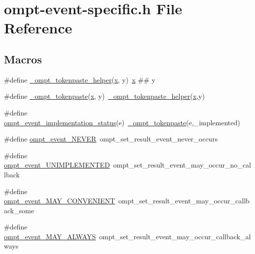 \hypertarget{ompt-event-specific_8h}{\section{ompt-\/event-\/specific.h File Reference}
\label{ompt-event-specific_8h}
}
\subsection*{Macros}
\begin{DoxyCompactItemize}
\item 
\#define \hyperlink{ompt-event-specific_8h_a164da313e074d6ea064ada353b36475d}{\-\_\-ompt\-\_\-tokenpaste\-\_\-helper}(\hyperlink{ittnotify__static_8h_a25eb27b280775b27a5ddc4d1673225aa}{x}, y)~\hyperlink{ittnotify__static_8h_a25eb27b280775b27a5ddc4d1673225aa}{x} \#\# y
\item 
\#define \hyperlink{ompt-event-specific_8h_aa58ed940a7c79f423856cf6e19aa7544}{\-\_\-ompt\-\_\-tokenpaste}(\hyperlink{ittnotify__static_8h_a25eb27b280775b27a5ddc4d1673225aa}{x}, y)~\hyperlink{ompt-event-specific_8h_a164da313e074d6ea064ada353b36475d}{\-\_\-ompt\-\_\-tokenpaste\-\_\-helper}(\hyperlink{ittnotify__static_8h_a25eb27b280775b27a5ddc4d1673225aa}{x},y)
\item 
\#define \hyperlink{ompt-event-specific_8h_a4566bae53765ccb37e5a8f1cb7b9cc99}{ompt\-\_\-event\-\_\-implementation\-\_\-status}(e)~\hyperlink{ompt-event-specific_8h_aa58ed940a7c79f423856cf6e19aa7544}{\-\_\-ompt\-\_\-tokenpaste}(e,\-\_\-implemented)
\item 
\#define \hyperlink{ompt-event-specific_8h_a20ce2d68a628f39fd7c0d3413e860641}{ompt\-\_\-event\-\_\-\-N\-E\-V\-E\-R}~ompt\-\_\-set\-\_\-result\-\_\-event\-\_\-never\-\_\-occurs
\item 
\#define \hyperlink{ompt-event-specific_8h_a5719430a79b410eee8d68fcec0fbf8f2}{ompt\-\_\-event\-\_\-\-U\-N\-I\-M\-P\-L\-E\-M\-E\-N\-T\-E\-D}~ompt\-\_\-set\-\_\-result\-\_\-event\-\_\-may\-\_\-occur\-\_\-no\-\_\-callback
\item 
\#define \hyperlink{ompt-event-specific_8h_ac90b1cf76e06d7fcbed9abf431841cbd}{ompt\-\_\-event\-\_\-\-M\-A\-Y\-\_\-\-C\-O\-N\-V\-E\-N\-I\-E\-N\-T}~ompt\-\_\-set\-\_\-result\-\_\-event\-\_\-may\-\_\-occur\-\_\-callback\-\_\-some
\item 
\#define \hyperlink{ompt-event-specific_8h_a4d43508adffb6fe8f9fe8a520b8142f4}{ompt\-\_\-event\-\_\-\-M\-A\-Y\-\_\-\-A\-L\-W\-A\-Y\-S}~ompt\-\_\-set\-\_\-result\-\_\-event\-\_\-may\-\_\-occur\-\_\-callback\-\_\-always

\end{DoxyCompactItemize}
